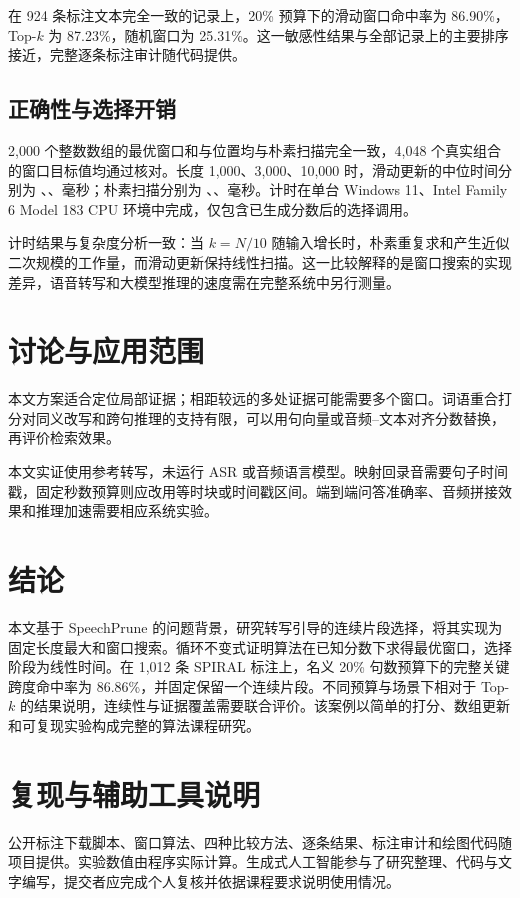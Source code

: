 \documentclass[10pt,journal,compsoc]{IEEEtran}
\begin{document}
在 924 条标注文本完全一致的记录上，20\% 预算下的滑动窗口命中率为 86.90\%，Top-$k$ 为 87.23\%，随机窗口为 25.31\%。这一敏感性结果与全部记录上的主要排序接近，完整逐条标注审计随代码提供。

\subsection{正确性与选择开销}
2,000 个整数数组的最优窗口和与位置均与朴素扫描完全一致，4,048 个真实组合的窗口目标值均通过核对。长度 1,000、3,000、10,000 时，滑动更新的中位时间分别为 \SlideSmall、\SlideMedium、\SlideLarge 毫秒；朴素扫描分别为 \NaiveSmall、\NaiveMedium、\NaiveLarge 毫秒。计时在单台 Windows 11、Intel Family 6 Model 183 CPU 环境中完成，仅包含已生成分数后的选择调用。

计时结果与复杂度分析一致：当 $k=N/10$ 随输入增长时，朴素重复求和产生近似二次规模的工作量，而滑动更新保持线性扫描。这一比较解释的是窗口搜索的实现差异，语音转写和大模型推理的速度需在完整系统中另行测量。

\section{讨论与应用范围}
本文方案适合定位局部证据；相距较远的多处证据可能需要多个窗口。词语重合打分对同义改写和跨句推理的支持有限，可以用句向量或音频--文本对齐分数替换，再评价检索效果。

本文实证使用参考转写，未运行 ASR 或音频语言模型。映射回录音需要句子时间戳，固定秒数预算则应改用等时块或时间戳区间。端到端问答准确率、音频拼接效果和推理加速需要相应系统实验。

\section{结论}
本文基于 SpeechPrune 的问题背景，研究转写引导的连续片段选择，将其实现为固定长度最大和窗口搜索。循环不变式证明算法在已知分数下求得最优窗口，选择阶段为线性时间。在 1,012 条 SPIRAL 标注上，名义 20\% 句数预算下的完整关键跨度命中率为 86.86\%，并固定保留一个连续片段。不同预算与场景下相对于 Top-$k$ 的结果说明，连续性与证据覆盖需要联合评价。该案例以简单的打分、数组更新和可复现实验构成完整的算法课程研究。

\section*{复现与辅助工具说明}
公开标注下载脚本、窗口算法、四种比较方法、逐条结果、标注审计和绘图代码随项目提供。实验数值由程序实际计算。生成式人工智能参与了研究整理、代码与文字编写，提交者应完成个人复核并依据课程要求说明使用情况。


\end{document}
